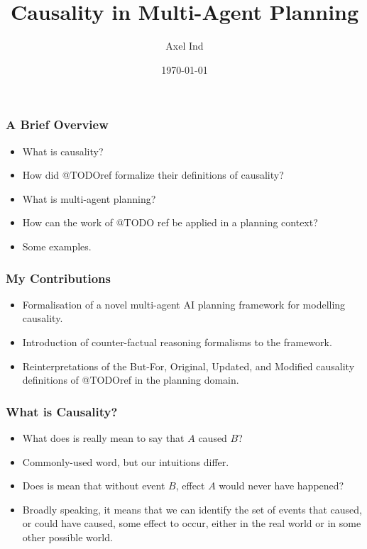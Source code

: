 \documentclass{beamer}
\title{Causality in Multi-Agent Planning}
\author{Axel Ind}
\institute{ALU-Freiburg}
\date{\today}
\theoremstyle{plain}
\theoremstyle{definition}
\begin{document}
 
\frame{\titlepage}

\begin{frame}
\frametitle{A Brief Overview}
\begin{itemize}
\item What is causality?
\item How did @TODOref formalize their definitions of causality?
\item What is multi-agent planning?
\item How can the work of @TODO ref be applied in a planning context?
\item Some examples.
\end{itemize}

\end{frame}


\begin{frame}
\frametitle{My Contributions}
\begin{itemize}
\item Formalisation of a novel multi-agent AI planning framework for modelling causality.
\item Introduction of counter-factual reasoning formalisms to the framework.
\item Reinterpretations of the But-For, Original, Updated, and Modified causality definitions of @TODOref in the planning domain.
\end{itemize}

\end{frame}


 
\begin{frame}
\frametitle{What is Causality?}
\begin{itemize}
\item What does is really mean to say that $A$ caused $B$?
\item Commonly-used word, but our intuitions differ.
\item Does is mean that without event $B$, effect $A$ would never have happened?
\item Broadly speaking, it means that we can identify the set of events that caused, or could have caused, some effect to occur, either in the real world or in some other possible world.

\end{itemize}

\end{frame}
\end{document}

